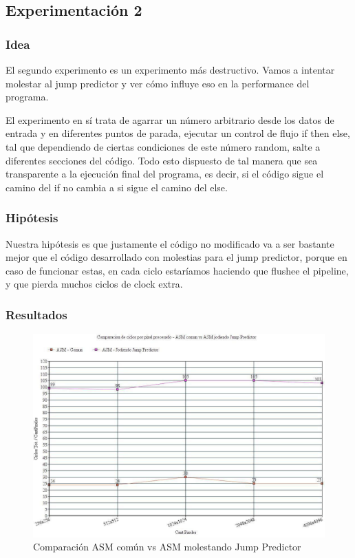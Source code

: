 \subsection{Experimentación 2}	

\subsubsection{Idea}
\par{El segundo experimento es un experimento más destructivo. Vamos a intentar molestar al jump predictor y ver cómo influye eso en la  performance del programa.}
\par{El experimento en sí trata de agarrar un número arbitrario desde los datos de entrada y en diferentes puntos de parada, ejecutar un control de flujo if then else, tal que dependiendo de ciertas condiciones de este número random, salte a diferentes secciones del código. Todo esto dispuesto de tal manera que sea transparente a la ejecución final del programa, es decir, si el código sigue el camino del if no cambia a si sigue el camino del else.}

\subsubsection{Hipótesis}
\par{Nuestra hipótesis es que justamente el código no modificado va a ser bastante mejor que el código desarrollado con molestias para el jump predictor, porque en caso de funcionar estas, en cada ciclo estaríamos haciendo que flushee el pipeline, y que pierda muchos ciclos de clock extra.}
	
\subsubsection{Resultados}

\medskip\begin{figure}[h!]
\centering
\captionsetup{justification=centering}
	\includegraphics[width = 15 cm, height = 8 cm]{imagenes/JumpPredictor.jpg}
	\caption[center]{Comparación ASM común vs ASM molestando Jump Predictor}
\end{figure}

